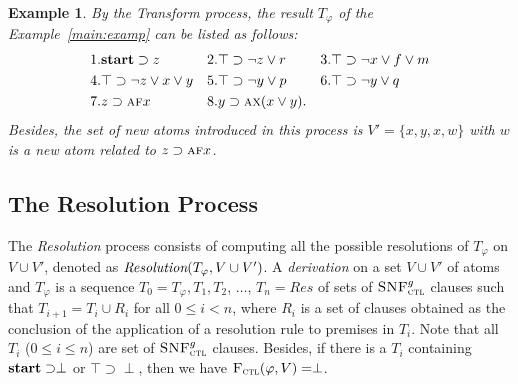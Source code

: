 \documentclass{article}
\newtheorem{example}{Example}
\begin{document}
\begin{example}\label{examp:Tran}
By the \emph{Transform} process, the result $T_{\varphi}$ of the Example~\ref{main:examp} can be listed as follows:
\begin{align*}
& 1. \textbf{start}\supset z && 2. \top \supset \neg z \vee r && 3.\top \supset \neg x\vee f \vee m\\
& 4. \top \supset \neg z \vee x \vee y && 5.\top \supset \neg y \vee p && 6.\top \supset \neg y \vee q\\
& 7. z \supset \textsc{a} \textsc{f} x && 8. y \supset \textsc{a} \textsc{x}(x\vee y).
\end{align*}
Besides, the set of new atoms introduced in this process is $V'=\{x, y,x, w\}$ with $w$ is a new atom related to $z \supset \textsc{a} \textsc{f} x$. %
\end{example}




\subsection{The Resolution Process}
The \emph{Resolution} process consists of computing all the possible resolutions of $T_{\varphi}$ on $V\cup V'$, denoted as $\emph{Resolution}(T_{\varphi}, V\cup V')$.
A \emph{derivation} on a set $V\cup V'$ of atoms and $T_{\varphi}$ is a sequence $T_0=T_{\varphi}, T_1, T_2$, $\dots$, $T_n=Res$ of sets of ${\textsc{SNF}_{\textsc{ctl}}^g}$ clauses such that $T_{i+1} = T_i \cup R_i$ for all $0\leq i < n$, where $R_i$ is a set of clauses obtained as the conclusion of the application of a resolution rule to premises in $T_i$.
Note that all $T_i$ ($0 \leq i \leq n$) are set of ${\textsc{SNF}_{\textsc{ctl}}^g}$ clauses.
Besides, if there is a $T_i$ containing $\textbf{start}\supset \perp$ or $\top\supset \perp$, then we have ${\textsc{F}_{\textsc{ctl}}}(\varphi, V)=\perp$.
\end{document}
